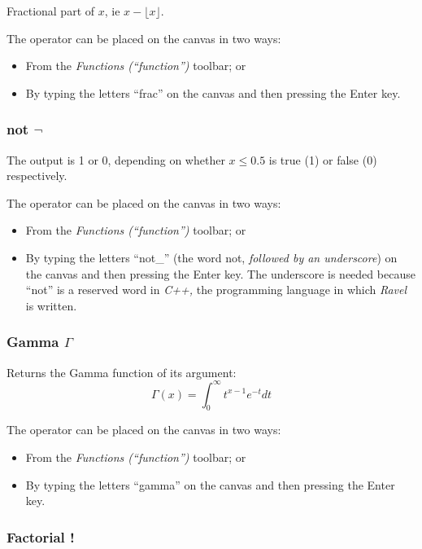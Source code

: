 
\label{Operation:frac} Fractional part of $x$, ie $x-\lfloor x\rfloor$.

The operator can be placed on the canvas in two ways:
\begin{itemize}
\item From the \emph{Functions (``function'')} toolbar; or 
\item By typing the letters ``frac'' on the canvas and then pressing the
Enter key.
\end{itemize}

\subsubsection{not $\neg$}


\label{Operation:not_} The output is 1 or 0, depending on whether
$x\le0.5$ is true (1) or false (0) respectively.

The operator can be placed on the canvas in two ways:
\begin{itemize}
\item From the \emph{Functions (``function'')} toolbar; or 
\item By typing the letters ``not\_'' (the word not, \emph{followed by an
underscore}) on the canvas and then pressing the Enter key. The underscore
is needed because ``not'' is a reserved word in \emph{C++,} the
programming language in which \emph{Ravel} is written.
\end{itemize}

\subsubsection{Gamma $\Gamma$}


\label{Operation:Gamma} Returns the Gamma function of its argument:
\[
\Gamma(x)=\int_{0}^{\infty}t^{x-1}e^{-t}dt
\]

The operator can be placed on the canvas in two ways:
\begin{itemize}
\item From the \emph{Functions (``function'')} toolbar; or 
\item By typing the letters ``gamma'' on the canvas and then pressing the
Enter key.
\end{itemize}

\subsubsection{Factorial !}

